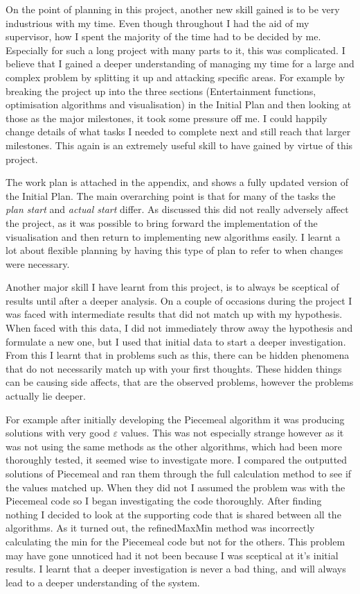 \documentclass[12pt]{report}
\begin{document}
On the point of planning in this project, another new skill gained is to be very industrious with my time. Even though throughout I had the aid of my supervisor, how I spent the majority of the time had to be decided by me. Especially for such a long project with many parts to it, this was complicated. I believe that I gained a deeper understanding of managing my time for a large and complex problem by splitting it up and attacking specific areas. For example by breaking the project up into the three sections (Entertainment functions, optimisation algorithms and visualisation) in the Initial Plan and then looking at those as the major milestones, it took some pressure off me. I could happily change details of what tasks I needed to complete next and still reach that larger milestones. This again is an extremely useful skill to have gained by virtue of this project.

The work plan is attached in the appendix, and shows a fully updated version of the Initial Plan. The main overarching point is that for many of the tasks the \textit{plan start} and \textit{actual start} differ. As discussed this did not really adversely affect the project, as it was possible to bring forward the implementation of the visualisation and then return to implementing new algorithms easily. I learnt a lot about flexible planning by having this type of plan to refer to when changes were necessary.

Another major skill I have learnt from this project, is to always be sceptical of results until after a deeper analysis. On a couple of occasions during the project I was faced with intermediate results that did not match up with my hypothesis. When faced with this data, I did not immediately throw away the hypothesis and formulate a new one, but I used that initial data to start a deeper investigation. From this I learnt that in problems such as this, there can be hidden phenomena that do not necessarily match up with your first thoughts. These hidden things can be causing side affects, that are the observed problems, however the problems actually lie deeper. 

For example after initially developing the Piecemeal algorithm it was producing solutions with very good $\varepsilon$ values. This was not especially strange however as it was not using the same methods as the other algorithms, which had been more thoroughly tested, it seemed wise to investigate more. I compared the outputted solutions of Piecemeal and ran them through the full calculation method to see if the values matched up. When they did not I assumed the problem was with the Piecemeal code so I began investigating the code thoroughly. After finding nothing I decided to look at the supporting code that is shared between all the algorithms. As it turned out, the refinedMaxMin method was incorrectly calculating the min for the Piecemeal code but not for the others. This problem may have gone unnoticed had it not been because I was sceptical at it's initial results. I learnt that a deeper investigation is never a bad thing, and will always lead to a deeper understanding of the system.
\end{document}
